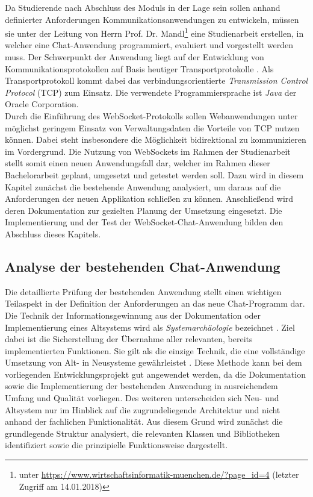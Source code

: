 \documentclass[11pt,a4paper,titlepage]{scrartcl}
\numberwithin{equation}{section}
\begin{document}
\noindent Da Studierende nach Abschluss des Moduls in der Lage sein sollen anhand definierter Anforderungen Kommunikationsanwendungen zu entwickeln, müssen sie unter der Leitung von Herrn Prof. Dr. Mandl\footnote{unter \url{https://www.wirtschaftsinformatik-muenchen.de/?page\_id=4} (letzter Zugriff am 14.01.2018)} eine Studienarbeit erstellen, in welcher eine Chat-Anwendung programmiert, evaluiert und vorgestellt werden muss. Der Schwerpunkt der Anwendung liegt auf der Entwicklung von Kommunikationsprotokollen auf Basis heutiger Transportprotokolle \autocite{mandl_datenkommunikation_2017}. Als Transportprotokoll kommt dabei das verbindungsorientierte \textit{Transmission Control Protocol} (TCP) zum Einsatz. Die verwendete Programmiersprache ist \textit{Java} der Oracle Corporation.\\

\noindent Durch die Einführung des WebSocket-Protokolls sollen Webanwendungen unter möglichst geringem Einsatz von Verwaltungsdaten die Vorteile von TCP nutzen können. Dabei steht insbesondere die Möglichkeit bidirektional zu kommunizieren im Vordergrund. Die Nutzung von WebSockets im Rahmen der Studienarbeit stellt somit einen neuen Anwendungsfall dar, welcher im Rahmen dieser Bachelorarbeit geplant, umgesetzt und getestet werden soll. Dazu wird in diesem Kapitel zunächst die bestehende Anwendung analysiert, um daraus auf die Anforderungen der neuen Applikation schließen zu können. Anschließend wird deren Dokumentation zur gezielten Planung der Umsetzung eingesetzt. Die Implementierung und der Test der WebSocket-Chat-Anwendung bilden den Abschluss dieses Kapitels. 

\subsection{Analyse der bestehenden Chat-Anwendung}
Die detaillierte Prüfung der bestehenden Anwendung stellt einen wichtigen Teilaspekt in der Definition der Anforderungen an das neue Chat-Programm dar. Die Technik der Informationsgewinnung aus der Dokumentation oder Implementierung eines Altsystems wird als \textit{Systemarchäologie} bezeichnet \autocite[38]{pohl_basiswissen_2009}. Ziel dabei ist die Sicherstellung der Übernahme aller relevanten, bereits implementierten Funktionen. Sie gilt als die einzige Technik, die eine vollständige Umsetzung von Alt- in Neusysteme gewährleistet \autocite[38]{pohl_basiswissen_2009}. Diese Methode kann bei dem vorliegenden Entwicklungsprojekt gut angewendet werden, da die Dokumentation sowie die Implementierung der bestehenden Anwendung in ausreichendem Umfang und Qualität vorliegen. Des weiteren unterscheiden sich Neu- und Altsystem nur im Hinblick auf die zugrundeliegende Architektur und nicht anhand der fachlichen Funktionalität. Aus diesem Grund wird zunächst die grundlegende Struktur analysiert, die relevanten Klassen und Bibliotheken identifiziert sowie die prinzipielle Funktionsweise dargestellt.
\end{document}
